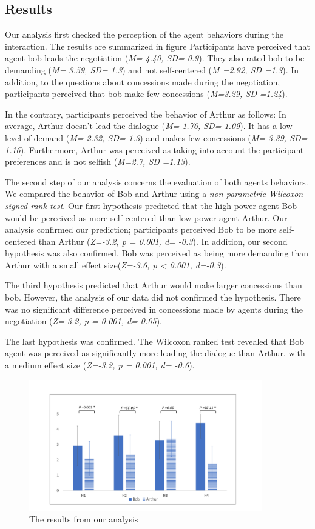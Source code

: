 \documentclass[runningheads,a4paper]{llncs}
\begin{document}
		\subsection{Results}
		
		
		Our analysis first checked the perception of the agent behaviors during the interaction. The results are summarized in figure 
		Participants have perceived that agent bob leads the negotiation (\emph{M= 4.40, SD= 0.9}). They also rated bob to be demanding (\emph{M= 3.59, SD= 1.3}) and not self-centered (\emph{M =2.92, SD =1.3}). In addition, to the questions about concessions made during the negotiation, participants perceived that bob make few concessions (\emph{M=3.29, SD =1.24}).
		
		In the contrary, participants perceived the behavior of Arthur as follows: In average, Arthur doesn't lead the dialogue (\emph{M= 1.76, SD= 1.09}). It has a low level of demand (\emph{M= 2.32, SD= 1.3}) and makes few concessions (\emph{M= 3.39, SD= 1.16}). Furthermore, Arthur was perceived as taking into account the participant preferences and is not selfish (\emph{M=2.7, SD =1.13}).
		
		The second step of our analysis concerns the evaluation of both agents behaviors. We compared the behavior of Bob and Arthur using a \textit{non parametric Wilcoxon signed-rank test}. Our first hypothesis predicted that the high power agent Bob would be perceived as more self-centered than low power agent Arthur. Our analysis confirmed our prediction; participants perceived Bob to be more self-centered than Arthur (\emph{Z=-3.2, p = 0.001, d= -0.3}). In addition, our second hypothesis was also confirmed. Bob was perceived as being more demanding than Arthur with a small effect size(\emph{Z=-3.6, p < 0.001, d=-0.3}). 
		
		The third hypothesis predicted that Arthur would make larger concessions than bob. However, the analysis of our data did not confirmed the hypothesis. There was no significant difference perceived in concessions made by agents during the negotiation (\emph{Z=-3.2, p = 0.001, d=-0.05}).
		
		The last hypothesis was confirmed. The Wilcoxon ranked test revealed that Bob agent was perceived as significantly more leading the dialogue than Arthur, with a medium effect size (\emph{Z=-3.2, p = 0.001, d= -0.6}).
			\vspace{-.9em}  
			\begin{figure}[h]
				\centering
				\includegraphics[width=4in]{graphs/res.pdf}
				\caption{The results from our analysis}
				\label{res}
			\end{figure}
			\vspace{-.5em} 
\end{document}
